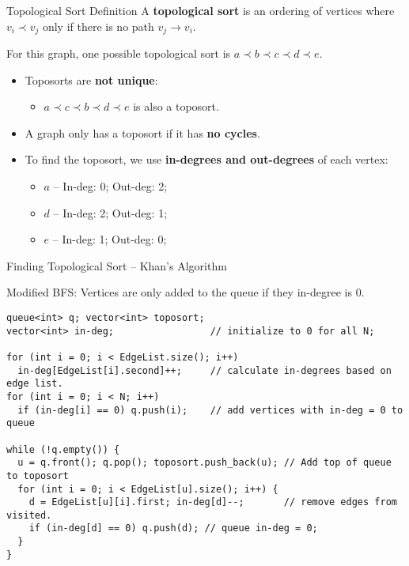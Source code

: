 \begin{frame}{Topological Sort Definition}
  A {\bf topological sort} is an ordering of vertices where $v_i \prec v_j$ only if there is no path $v_j \to v_i$.\bigskip
  \begin{center}
    
  \end{center}
  For this graph, one possible topological sort is $a \prec b \prec c \prec d \prec e$.\bigskip

  \begin{itemize}
    \item Toposorts are {\bf not unique}:
    \begin{itemize}
      \item $a \prec c \prec b \prec d \prec e$ is also a toposort.
    \end{itemize}
    \item A graph only has a toposort if it has {\bf no cycles}.
    \item To find the toposort, we use {\bf in-degrees and out-degrees} of each vertex:
    \begin{itemize}
      \item $a$ -- In-deg: 0; Out-deg: 2;
      \item $d$ -- In-deg: 2; Out-deg: 1;
      \item $e$ -- In-deg: 1; Out-deg: 0;
    \end{itemize}
  \end{itemize}
\end{frame}

\begin{frame}[fragile]{Finding Topological Sort -- Khan's Algorithm}

Modified BFS: Vertices are only added to the queue if they in-degree is 0.

\begin{exampleblock}{}
  {\smaller
\begin{verbatim}
queue<int> q; vector<int> toposort;
vector<int> in-deg;                 // initialize to 0 for all N;

for (int i = 0; i < EdgeList.size(); i++)
  in-deg[EdgeList[i].second]++;     // calculate in-degrees based on edge list.
for (int i = 0; i < N; i++)
  if (in-deg[i] == 0) q.push(i);    // add vertices with in-deg = 0 to queue

while (!q.empty()) {
  u = q.front(); q.pop(); toposort.push_back(u); // Add top of queue to toposort
  for (int i = 0; i < EdgeList[u].size(); i++) {
    d = EdgeList[u][i].first; in-deg[d]--;       // remove edges from visited.
    if (in-deg[d] == 0) q.push(d); // queue in-deg = 0;
  }
}
\end{verbatim}}
  \end{exampleblock}
\end{frame}

